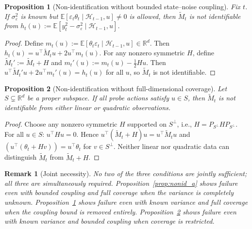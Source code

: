 \documentclass[11pt]{article}
\newcommand{\R}{\mathbb{R}}
\newcommand{\E}{\mathbb{E}}
\newcommand{\cH}{\mathcal{H}}
\newtheorem{proposition}{Proposition}
\newtheorem{remark}{Remark}
\begin{document}
\begin{proposition}[Non-identification without bounded state--noise coupling]
\label{prop:nonid_b}
Fix $t$.  If $\sigma_\varepsilon^2$ is known but
$\E[\varepsilon_t\theta_t\mid\cH_{t-1},u]\neq 0$ is allowed, then $\widetilde{M}_t$
is not identifiable from
$h_t(u):=\E[y_t^2-\sigma_\varepsilon^2\mid\cH_{t-1},u]$.
\end{proposition}

\begin{proof}
Define $m_t(u):=\E[\theta_t\varepsilon_t\mid\cH_{t-1},u]\in\R^d$.
Then $h_t(u) = u^\top\widetilde{M}_t u + 2u^\top m_t(u)$.
For any nonzero symmetric $H$, define $\widetilde{M}_t':=\widetilde{M}_t+H$ and
$m_t'(u):=m_t(u)-\tfrac{1}{2}Hu$.
Then $u^\top\widetilde{M}_t'u + 2u^\top m_t'(u)=h_t(u)$ for all $u$, so
$\widetilde{M}_t$ is not identifiable.
\end{proof}

\begin{proposition}[Non-identification without full-dimensional coverage]
\label{prop:nonid_c}
Let $S\subsetneq\R^d$ be a proper subspace.
If all probe actions satisfy $u\in S$, then $\widetilde{M}_t$ is not identifiable from
either linear or quadratic observations.
\end{proposition}

\begin{proof}
Choose any nonzero symmetric $H$ supported on $S^\perp$, i.e.,
$H=P_{S^\perp}HP_{S^\perp}$.
For all $u\in S$: $u^\top Hu=0$.
Hence $u^\top(\widetilde{M}_t+H)u = u^\top\widetilde{M}_tu$ and
$(u^\top(\theta_t+Hv))=u^\top\theta_t$ for $v\in S^\perp$.
Neither linear nor quadratic data can distinguish $\widetilde{M}_t$ from
$\widetilde{M}_t+H$.
\end{proof}

\begin{remark}[Joint necessity]
\label{rem:joint_necessity}
No two of the three conditions are jointly sufficient; all three are simultaneously
required.
Proposition~\ref{prop:nonid_a} shows failure even with bounded coupling and full
coverage when the variance is completely unknown.
Proposition~\ref{prop:nonid_b} shows failure even with known variance and full
coverage when the coupling bound is removed entirely.
Proposition~\ref{prop:nonid_c} shows failure even with known variance and bounded
coupling when coverage is restricted.
\end{remark}
\end{document}

